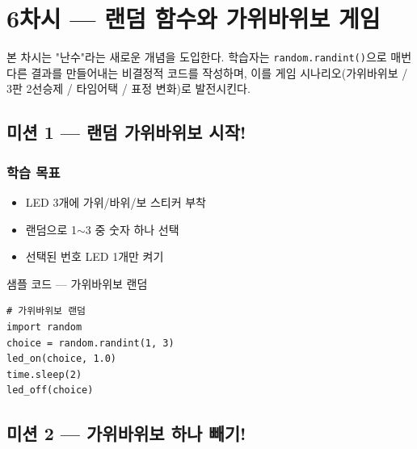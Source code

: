 \section{6차시 --- 랜덤 함수와 가위바위보 게임}
\label{sec:ch06}

본 차시는 "난수"라는 새로운 개념을 도입한다. 학습자는
\texttt{random.randint()}으로 매번 다른 결과를 만들어내는 비결정적
코드를 작성하며, 이를 게임 시나리오(가위바위보 / 3판 2선승제 / 타임어택
/ 표정 변화)로 발전시킨다.

\subsection{미션 1 --- 랜덤 가위바위보 시작!}
\label{subsec:ch06-m1}

\begin{storybox}
\end{storybox}

\subsubsection*{학습 목표}
\begin{itemize}[leftmargin=1.4em]
  \item LED 3개에 가위/바위/보 스티커 부착
  \item 랜덤으로 1$\sim$3 중 숫자 하나 선택
  \item 선택된 번호 LED 1개만 켜기
\end{itemize}

\begin{labbox}{샘플 코드 --- 가위바위보 랜덤}
\begin{verbatim}
# 가위바위보 랜덤
import random
choice = random.randint(1, 3)
led_on(choice, 1.0)
time.sleep(2)
led_off(choice)
\end{verbatim}
\end{labbox}

\subsection{미션 2 --- 가위바위보 하나 빼기!}
\label{subsec:ch06-m2}

\begin{storybox}
\end{storybox}

